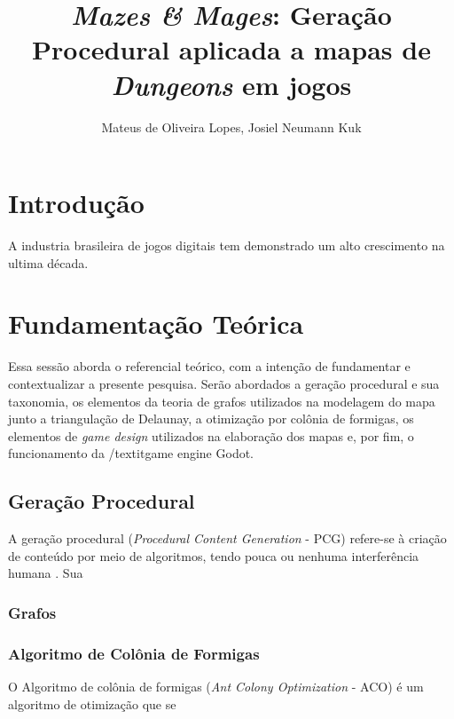 \documentclass[12pt]{article}
\title{\textit{Mazes \& Mages}: Geração Procedural aplicada a mapas de \textit{Dungeons} em jogos}
\author{Mateus de Oliveira Lopes\inst{1}, Josiel Neumann Kuk\inst{1}}
\begin{document}
 

\maketitle

\begin{abstract}

\end{abstract}
     
\begin{resumo} 

\end{resumo}

\section{Introdução}
A industria brasileira de jogos digitais tem demonstrado um alto crescimento na ultima década.


\section{Fundamentação Teórica}
Essa sessão aborda o referencial teórico, com a intenção de fundamentar e contextualizar a presente pesquisa. Serão abordados a geração 
procedural e sua taxonomia, os elementos da teoria de grafos utilizados na modelagem do mapa junto a triangulação de Delaunay, a otimização
por colônia de formigas, os elementos de \textit{game design} utilizados na elaboração dos mapas e, por fim, o funcionamento da /textit{game engine Godot.}

\subsection{Geração Procedural}
A geração procedural (\textit{Procedural Content Generation} - PCG) refere-se à criação de conteúdo por meio de algoritmos, tendo pouca ou nenhuma
interferência humana \cite{}. Sua 

\subsubsection{Grafos}

\subsubsection{Algoritmo de Colônia de Formigas}
O Algoritmo de colônia de formigas (\textit{Ant Colony Optimization} - ACO) é um algoritmo de otimização que se 
\end{document}
